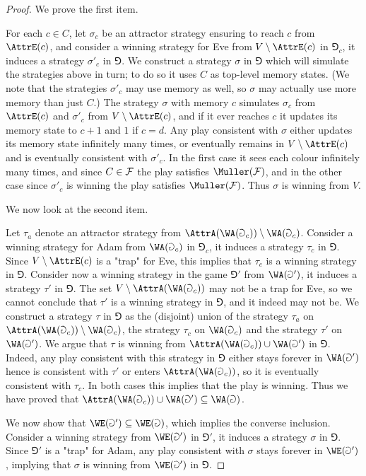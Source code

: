\begin{proof}
We prove the first item.

For each $c \in C$, let $\sigma_c$ be an attractor strategy ensuring to reach $c$ from $\AttrE(c)$,
and consider a winning strategy for Eve from $V \setminus \AttrE(c)$ in $\Game_c$, it induces a strategy $\sigma'_c$ in $\Game$.
We construct a strategy $\sigma$ in $\Game$ which will simulate the strategies above in turn; to do so it uses $C$ as top-level memory states.
(We note that the strategies $\sigma'_c$ may use memory as well, so $\sigma$ may actually use more memory than just $C$.)
The strategy $\sigma$ with memory $c$ simulates $\sigma_c$ from $\AttrE(c)$ and $\sigma'_c$ from $V \setminus \AttrE(c)$,
and if it ever reaches $c$ it updates its memory state to $c + 1$ and $1$ if $c = d$.
Any play consistent with $\sigma$ either updates its memory state infinitely many times, 
or eventually remains in $V \setminus \AttrE(c)$ and is eventually consistent with $\sigma'_c$.
In the first case it sees each colour infinitely many times, and since $C \in \mathcal{F}$ the play satisfies $\Muller(\F)$, 
and in the other case since $\sigma'_c$ is winning the play satisfies $\Muller(\F)$.
Thus $\sigma$ is winning from $V$.

We now look at the second item.

Let $\tau_a$ denote an attractor strategy from $\AttrA(\WA(\Game_c)) \setminus \WA(\Game_c)$.
Consider a winning strategy for Adam from $\WA(\Game_c)$ in $\Game_c$, it induces a strategy $\tau_c$ in $\Game$.
Since $V \setminus \AttrE(c)$ is a "trap" for Eve, this implies that $\tau_c$ is a winning strategy in $\Game$.
Consider now a winning strategy in the game $\Game'$ from $\WA(\Game')$, it induces a strategy $\tau'$ in $\Game$.
The set $V \setminus \AttrA( \WA(\Game_c) )$ may not be a trap for Eve, so we cannot conclude that $\tau'$ is a winning strategy in $\Game$,
and it indeed may not be.
We construct a strategy $\tau$ in $\Game$ as the (disjoint) union of the strategy $\tau_a$ on $\AttrA(\WA(\Game_c)) \setminus \WA(\Game_c)$,
the strategy $\tau_c$ on $\WA(\Game_c)$ and the strategy $\tau'$ on $\WA(\Game')$.
We argue that $\tau$ is winning from $\AttrA( \WA(\Game_c) ) \cup \WA(\Game')$ in $\Game$.
Indeed, any play consistent with this strategy in $\Game$ either stays forever in $\WA(\Game')$ hence is consistent with $\tau'$
or enters $\AttrA( \WA(\Game_c) )$, so it is eventually consistent with $\tau_c$.
In both cases this implies that the play is winning.
Thus we have proved that $\AttrA( \WA(\Game_c) ) \cup \WA(\Game') \subseteq \WA(\Game)$.

We now show that $\WE(\Game') \subseteq \WE(\Game)$, which implies the converse inclusion.
Consider a winning strategy from $\WE(\Game')$ in $\Game'$, it induces a strategy $\sigma$ in $\Game$.
Since $\Game'$ is a "trap" for Adam, any play consistent with $\sigma$ stays forever in $\WE(\Game')$, 
implying that $\sigma$ is winning from $\WE(\Game')$ in $\Game$.
\end{proof}

